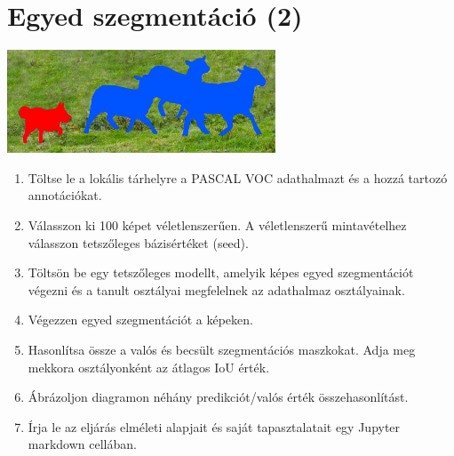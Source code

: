 \documentclass[english]{article}
\begin{document}
\section{Egyed szegmentáció (2)}
\begin{center}
\includegraphics[width=8cm, keepaspectratio]{images/semantic_segmentation.jpg}
\end{center}
\begin{enumerate}
	\item Töltse le a lokális tárhelyre a PASCAL VOC adathalmazt és a hozzá tartozó annotációkat.
	\item Válasszon ki 100 képet véletlenszerűen. A véletlenszerű mintavételhez válasszon tetszőleges bázisértéket (seed).
	\item Töltsön be egy tetszőleges modellt, amelyik képes egyed szegmentációt végezni és a tanult osztályai megfelelnek az adathalmaz osztályainak. 
	\item Végezzen egyed szegmentációt a képeken. 
	\item Hasonlítsa össze a valós és becsült szegmentációs maszkokat. Adja meg mekkora osztályonként az átlagos IoU érték. 
	\item Ábrázoljon diagramon néhány predikciót/valós érték összehasonlítást.
	\item Írja le az eljárás elméleti alapjait és saját tapasztalatait egy Jupyter markdown cellában.
\end{enumerate}
\end{document}
